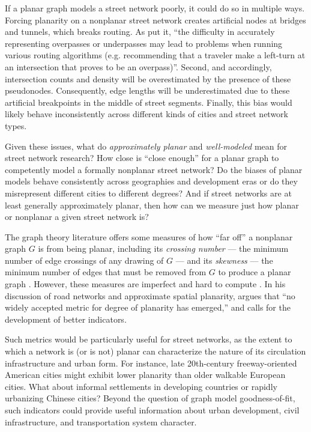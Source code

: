 \documentclass[Afour,sageh,times]{sagej}
\begin{document}
If a planar graph models a street network poorly, it could do so in multiple ways. Forcing planarity on a nonplanar street network creates artificial nodes at bridges and tunnels, which breaks routing. As \citet[p.~6]{kwan_review_1996} put it, \enquote{the difficulty in accurately representing overpasses or underpasses may lead to problems when running various routing algorithms (e.g. recommending that a traveler make a left-turn at an intersection that proves to be an overpass)}. Second, and accordingly, intersection counts and density will be overestimated by the presence of these pseudonodes. Consequently, edge lengths will be underestimated due to these artificial breakpoints in the middle of street segments. Finally, this bias would likely behave inconsistently across different kinds of cities and street network types.

Given these issues, what do \emph{approximately planar} and \emph{well-modeled} mean for street network research? How close is \enquote{close enough} for a planar graph to competently model a formally nonplanar street network? Do the biases of planar models behave consistently across geographies and development eras or do they misrepresent different cities to different degrees? And if street networks are at least generally approximately planar, then how can we measure just how planar or nonplanar a given street network is?

The graph theory literature offers some measures of how \enquote{far off} a nonplanar graph $G$ is from being planar, including its \emph{crossing number} --- the minimum number of edge crossings of any drawing of $G$ --- and its \emph{skewness} --- the minimum number of edges that must be removed from $G$ to produce a planar graph \citep{liebers_planarizing_2001,szekely_successful_2004,chimani_non-planar_2009}. However, these measures are imperfect and hard to compute \citep{chimani_vertex_2012,szekely_successful_2004}. In his discussion of road networks and approximate spatial planarity, \citet[p.~133]{newman_networks:_2010} argues that \enquote{no widely accepted metric for degree of planarity has emerged,} and calls for the development of better indicators.

Such metrics would be particularly useful for street networks, as the extent to which a network is (or is not) planar can characterize the nature of its circulation infrastructure and urban form. For instance, late 20th-century freeway-oriented American cities might exhibit lower planarity than older walkable European cities. What about informal settlements in developing countries or rapidly urbanizing Chinese cities? Beyond the question of graph model goodness-of-fit, such indicators could provide useful information about urban development, civil infrastructure, and transportation system character.
\end{document}
